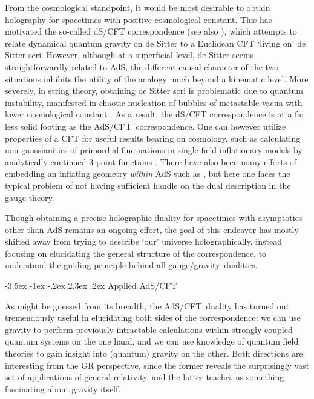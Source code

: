 \documentclass[12pt]{article}
\makeatletter
\renewcommand\section{\@startsection {section}{1}{\z@}%
                                   {-3.5ex \@plus -1ex \@minus -.2ex}%
                                   {2.3ex \@plus.2ex}%
                                   {\normalfont\large\bfseries}}
\def\AC{AdS/CFT}
\def\GG{gauge/gravity}
\def\GT{gauge theory}
\makeatother
\begin{document}
From the cosmological standpoint, it would be most desirable to obtain holography for spacetimes with positive cosmological constant.  This has motivated the so-called dS/CFT correspondence \cite{Strominger:2001pn} (see also \cite{Witten:2001kn}), which attempts to relate dynamical quantum gravity on de Sitter to a Euclidean CFT `living on' de Sitter scri.  However, although at a superficial level, de Sitter seems straightforwardly related to AdS, the different causal character of the two situations inhibits the utility of the analogy much beyond a kinematic level.  
More severely, in string theory, obtaining de Sitter scri is problematic due to quantum instability, manifested in chaotic nucleation of bubbles of metastable vacua with lower cosmological constant  \cite{Susskind:2003kw}.  As a result, the  dS/CFT correspondence is at a far less solid footing as the \AC\ correspondence. 
One can however utilize properties of a CFT for useful results bearing on cosmology, such as calculating non-gaussianities of primordial fluctuations in single field inflationary models by analytically continued 3-point functions \cite{Maldacena:2002vr}.
There have also been many efforts of embedding an inflating geometry {\it within} AdS such as \cite{Freivogel:2005qh}, but here one faces the typical problem of not having sufficient handle on the dual description in the \GT.  

 Though obtaining a 
 precise holographic duality for spacetimes with asymptotics other than AdS remains an ongoing effort, the goal of  this endeavor has mostly shifted away from trying to describe `our' universe holographically, instead focusing on elucidating the general structure of the correspondence, to understand the guiding principle behind all \GG\  dualities.

\section{Applied \AC}
\label{s:appliedAC}

As might be guessed from its breadth, the \AC\ duality has turned out  tremendously useful in elucidating both sides of the correspondence: we can use gravity to perform previously intractable calculations within strongly-coupled quantum systems on the one hand, and we can use knowledge of quantum field theories to gain insight into (quantum) gravity on the other.  Both directions are interesting from the GR perspective, since the former reveals the surprisingly vast set of applications of general relativity, and the latter teaches us something fascinating about gravity itself.  
\end{document}

